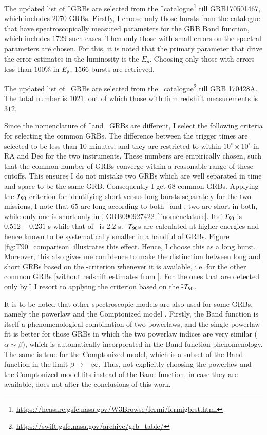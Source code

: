 The updated list of \f\ GRBs are selected from the \f\ catalogue\footnote{\url{https://heasarc.gsfc.nasa.gov/W3Browse/fermi/fermigbrst.html}} till GRB170501467, which includes $2070$ GRBs. Firstly, I choose only those bursts from the catalogue that have spectroscopically measured parameters for the GRB Band function, which includes $1729$ such cases. Then only those with small errors on the spectral parameters are chosen. For this, it is noted that the primary parameter that drive the error estimates in the luminosity is the $E_p$. Choosing only those with errors less than $100\%$ in $E_{\rm p}$, $1566$ bursts are retrieved.

The updated list of \s\ GRBs are selected from the \s\ catalogue\footnote{\url{https://swift.gsfc.nasa.gov/archive/grb_table/}} till GRB 170428A. The total number is $1021$, out of which those with firm redshift measurements is $312$.

Since the nomenclature of \f\ and \s\ GRBs are different, I select the following criteria for selecting the common GRBs. The difference between the trigger times are selected to be less than $10$ minutes, and they are restricted to within $10^{\circ} \times 10^{\circ}$ in RA and Dec for the two instruments. These numbers are empirically chosen, such that the common number of GRBs converge within a reasonable range of these cutoffs. This ensures I do not mistake two GRBs which are well separated in time and space to be the same GRB. Consequently I get $68$ common GRBs. Applying the $T_{\rm{90}}$ criterion for identifying short versus long bursts  separately for the two missions, I note that $65$ are long according to both \f\ and \s, two are short in both, while only one is short only in \f, GRB090927422 [\f\ nomenclature]. Its \f-$T_{\rm{90}}$ is $0.512 \pm 0.231$ s while that of \s\ is $2.2$ s. \f-$T_{\rm{90}}$s are calculated at higher energies and hence known to be systematically smaller in a handful of GRBs. Figure \ref{fig:T90_comparison} illustrates this effect. Hence, I choose this as a long burst. Moreover, this also gives me confidence to make the distinction between long and short GRBs based on the \s-criterion whenever it is available, i.e. for the other common GRBs [without redshift estimates from \s]. For the ones that are detected only by \f, I resort to applying the criterion based on the \f-$T_{\rm{90}}$.

It is to be noted that other spectroscopic models are also used for some GRBs, namely the powerlaw and the Comptonized model \citep{Gruber_et_al.-2014-ApJS--Fermi_catalogue}. Firstly, the Band function is itself a phenomenological combination of two powerlaws, and the single powerlaw fit is better for those GRBs in which the two powerlaw indices are very similar ($ \alpha \sim \beta$), which is automatically incorporated in the Band function phenomenology. The same is true for the Comptonized model, which is a subset of the Band function in the limit $ \beta \to - \infty$. Thus, not explicitly choosing the powerlaw and the Comptonized model fits instead of the Band function, in case they are available, does not alter the conclusions of this work.



